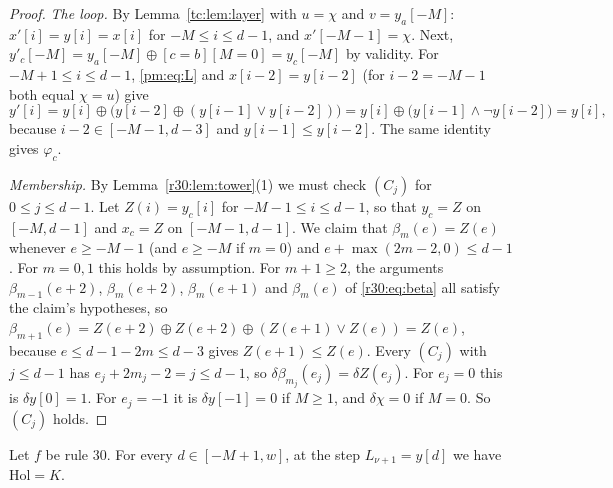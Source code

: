 \begin{proof}
\emph{The loop.} By Lemma~\ref{tc:lem:layer} with $u=\chi$ and $v=y_a[-M]$: $x'[i]=y[i]=x[i]$ for $-M\le i\le d-1$, and $x'[-M-1]=\chi$. Next, $y'_c[-M]=y_a[-M]\oplus[c=b][M=0]=y_c[-M]$ by validity. For $-M+1\le i\le d-1$, \eqref{pm:eq:L} and $x[i-2]=y[i-2]$ (for $i-2=-M-1$ both equal $\chi=u$) give
\[
y'[i]=y[i]\oplus\bigl(y[i-2]\oplus(y[i-1]\vee y[i-2])\bigr)=y[i]\oplus\bigl(y[i-1]\wedge\neg y[i-2]\bigr)=y[i],
\]
because $i-2\in[-M-1,d-3]$ and $y[i-1]\le y[i-2]$. The same identity gives $\varphi_c$.

\emph{Membership.} By Lemma~\ref{r30:lem:tower}(1) we must check $(C_j)$ for $0\le j\le d-1$. Let $Z(i)=y_c[i]$ for $-M-1\le i\le d-1$, so that $y_c=Z$ on $[-M,d-1]$ and $x_c=Z$ on $[-M-1,d-1]$. We claim that $\beta_m(e)=Z(e)$ whenever $e\ge-M-1$ (and $e\ge-M$ if $m=0$) and $e+\max(2m-2,0)\le d-1$. For $m=0,1$ this holds by assumption. For $m+1\ge2$, the arguments $\beta_{m-1}(e+2)$, $\beta_m(e+2)$, $\beta_m(e+1)$ and $\beta_m(e)$ of \eqref{r30:eq:beta} all satisfy the claim's hypotheses, so $\beta_{m+1}(e)=Z(e+2)\oplus Z(e+2)\oplus(Z(e+1)\vee Z(e))=Z(e)$, because $e\le d-1-2m\le d-3$ gives $Z(e+1)\le Z(e)$. Every $(C_j)$ with $j\le d-1$ has $e_j+2m_j-2=j\le d-1$, so $\delta\beta_{m_j}(e_j)=\delta Z(e_j)$. For $e_j=0$ this is $\delta y[0]=1$. For $e_j=-1$ it is $\delta y[-1]=0$ if $M\ge1$, and $\delta\chi=0$ if $M=0$. So $(C_j)$ holds.
\end{proof}

\begin{lemma}\label{r30:lem:holonomy}
Let $f$ be rule $30$. For every $d\in[-M+1,w]$, at the step $L_{\nu+1}=y[d]$ we have $\mathrm{Hol}=K$.
\end{lemma}


